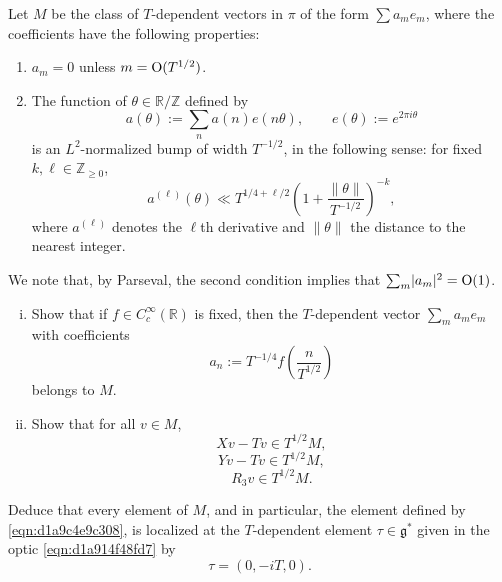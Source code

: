 \documentclass[reqno]{amsart} 
\numberwithin{equation}{section}
\begin{document}
\begin{exercise}\label{exercise:d1a94c55524c}
  Let $M$ be the class of $T$-dependent vectors in $\pi$ of the form $\sum a_m e_m$, where the coefficients have the following properties:
  \begin{enumerate}
  \item $a_m = 0$ unless $m = \operatorname{O}(T^{1/2})$.
  \item The function of $\theta \in \mathbb{R} / \mathbb{Z}$ defined by
    \begin{equation*}
      a(\theta) := \sum_n a(n) e (n \theta), \qquad
      e(\theta) := e^{2 \pi i \theta }      
    \end{equation*}
    is an $L^2$-normalized bump of width $T^{-1/2}$, in the following sense: for fixed $k , \ell \in \mathbb{Z}_{\geq 0}$,
    \begin{equation}\label{eqn:d1a9c4e68198}
      a^{(\ell)}(\theta) \ll
      T^{1/4 + \ell/2} \left( 1+ \frac{\lVert \theta  \rVert}{T^{-1/2}} \right)^{-k},
    \end{equation}
    where $a^{(\ell)}$ denotes the $\ell$th derivative and $\lVert \theta \rVert$ the distance to the nearest integer.
  \end{enumerate}
  We note that, by Parseval, the second condition implies that $\sum_m \lvert a_m \rvert^2 = \operatorname{O}(1)$.
  \begin{enumerate}[(i)]
  \item Show that if $f \in C_c^\infty(\mathbb{R})$ is fixed, then the $T$-dependent vector $\sum_m a_m e_m$ with coefficients
    \begin{equation}\label{eqn:d1a9c4e9c308}
      a_n := T^{-1/4} f\left( \frac{n}{T^{1/2}} \right)
    \end{equation}
    belongs to $M$.
  \item Show that for all $v \in M$,
    \begin{equation*}
      X v - T v \in T^{1/2} M,
    \end{equation*}
    \begin{equation*}
      Y v - T v \in T^{1/2} M,
    \end{equation*}
    \begin{equation*}
      R_3 v \in T^{1/2} M.
    \end{equation*}
  \end{enumerate}
  Deduce that every element of $M$, and in particular, the element defined by \eqref{eqn:d1a9c4e9c308}, is localized at the $T$-dependent element $\tau \in \mathfrak{g}^*$ given in the optic \eqref{eqn:d1a914f48fd7} by
  \begin{equation*}
    \tau = (0,-iT,0).
  \end{equation*}
\end{exercise}
\end{document}
